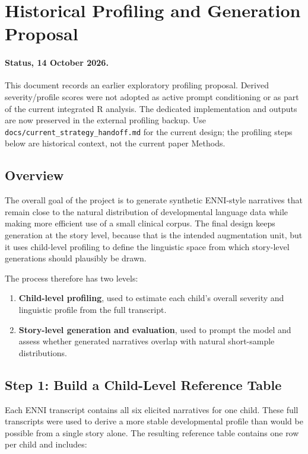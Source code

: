 \section{Historical Profiling and Generation Proposal}

\paragraph{Status, 14 October 2026.}
This document records an earlier exploratory profiling proposal. Derived
severity/profile scores were not adopted as active prompt conditioning or
as part of the current integrated R analysis. The dedicated implementation
and outputs are now preserved in the external profiling backup. Use
\texttt{docs/current\_strategy\_handoff.md} for the current design; the
profiling steps below are historical context, not the current paper Methods.

\subsection{Overview}

The overall goal of the project is to generate synthetic ENNI-style narratives that remain close to the natural distribution of developmental language data while making more efficient use of a small clinical corpus. The final design keeps generation at the story level, because that is the intended augmentation unit, but it uses child-level profiling to define the linguistic space from which story-level generations should plausibly be drawn.

The process therefore has two levels:

\begin{enumerate}
    \item \textbf{Child-level profiling}, used to estimate each child's overall severity and linguistic profile from the full transcript.
    \item \textbf{Story-level generation and evaluation}, used to prompt the model and assess whether generated narratives overlap with natural short-sample distributions.
\end{enumerate}

\subsection{Step 1: Build a Child-Level Reference Table}

Each ENNI transcript contains all six elicited narratives for one child. These full transcripts were used to derive a more stable developmental profile than would be possible from a single story alone. The resulting reference table contains one row per child and includes:


